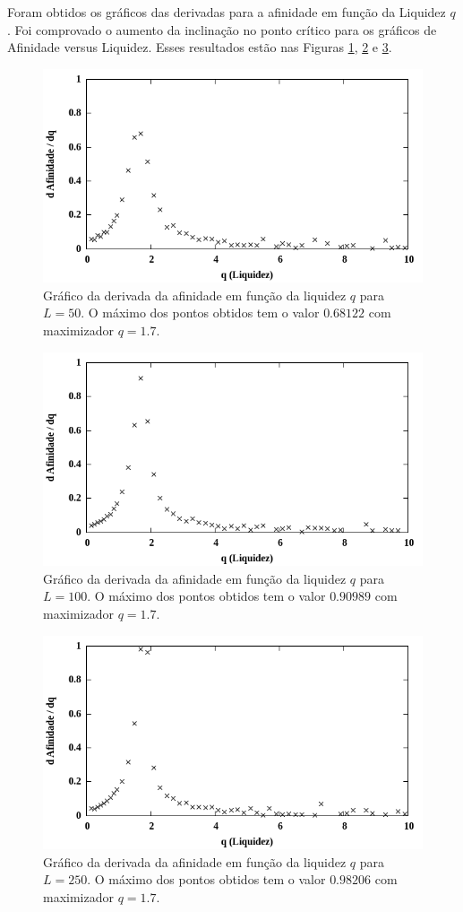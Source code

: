 \documentclass[12pt,a4paper,final]{article}
\begin{document}
  Foram obtidos os gráficos das derivadas para a afinidade em função da Liquidez $q$. Foi comprovado o aumento da inclinação no ponto crítico para os gráficos de Afinidade versus Liquidez. Esses resultados estão nas Figuras \ref{fig:L50-derivada}, \ref{fig:L100-derivada} e \ref{fig:L250-derivada}.

  \begin{figure}[h]
    \centering
    \includegraphics[width=.7\linewidth]{L50-derivada.png}
    \caption{Gráfico da derivada da afinidade em função da liquidez $q$ para $L=50$. O máximo dos pontos obtidos tem o valor $0.68122$ com maximizador $q=1.7$.}
    \label{fig:L50-derivada}
  \end{figure}

  \begin{figure}[h]
    \centering
    \includegraphics[width=.7\linewidth]{L100-derivada.png}
    \caption{Gráfico da derivada da afinidade em função da liquidez $q$ para $L=100$. O máximo dos pontos obtidos tem o valor $0.90989$ com maximizador $q=1.7$.}
    \label{fig:L100-derivada}
  \end{figure}

  \begin{figure}[h]
    \centering
    \includegraphics[width=.7\linewidth]{L250-derivada.png}
    \caption{Gráfico da derivada da afinidade em função da liquidez $q$ para $L=250$. O máximo dos pontos obtidos tem o valor $0.98206$ com maximizador $q=1.7$.}
    \label{fig:L250-derivada}
  \end{figure}
\end{document}
